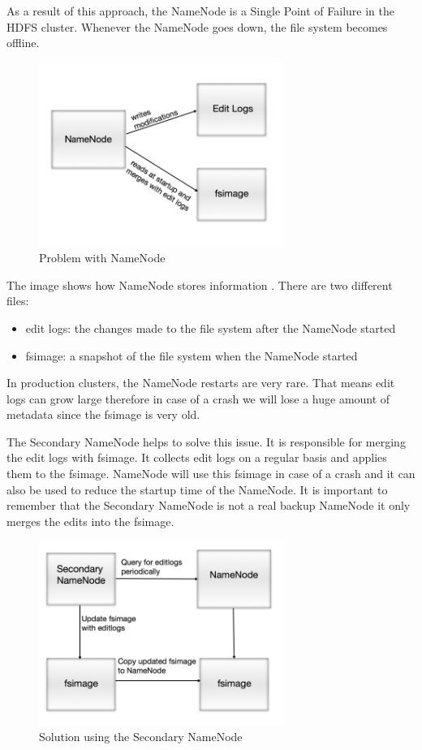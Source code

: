 As a result of this approach, the NameNode is a Single Point of Failure in the HDFS cluster. Whenever the NameNode goes down, the file system becomes offline.
\begin{figure}[H]
	\includegraphics[width=80mm, keepaspectratio]{figures/namenode_problem.png}
	\centering
	\caption*{Problem with NameNode}
\end{figure}
The image shows how NameNode stores information \cite{Secondary-NameNode}. There are two different files:
\begin{itemize}
	\item edit logs: the changes made to the file system after the NameNode started
	\item fsimage: a snapshot of the file system when the NameNode started
\end{itemize}
In production clusters, the NameNode restarts are very rare. That means edit logs can grow large therefore in case of a crash we will lose a huge amount of metadata since the fsimage is very old.

The Secondary NameNode helps to solve this issue. It is responsible for merging the edit logs with fsimage. It collects edit logs on a regular basis and applies them to the fsimage. NameNode will use this fsimage in case of a crash and it can also be used to reduce the startup time of the NameNode.
It is important to remember that the Secondary NameNode is not a real backup NameNode it only merges the edits into the fsimage. 

\begin{figure}[H]
	\includegraphics[width=80mm, keepaspectratio]{figures/secondary_namenode.png}
	\centering
	\caption*{Solution using the Secondary NameNode}
\end{figure}

